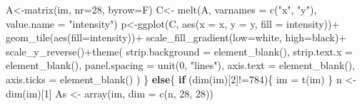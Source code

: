 \documentclass[
]{book}
\newenvironment{Shaded}{\begin{snugshade}}{\end{snugshade}}
\newcommand{\AttributeTok}[1]{\textcolor[rgb]{0.77,0.63,0.00}{#1}}
\newcommand{\ControlFlowTok}[1]{\textcolor[rgb]{0.13,0.29,0.53}{\textbf{#1}}}
\newcommand{\DecValTok}[1]{\textcolor[rgb]{0.00,0.00,0.81}{#1}}
\newcommand{\FunctionTok}[1]{\textcolor[rgb]{0.00,0.00,0.00}{#1}}
\newcommand{\NormalTok}[1]{#1}
\newcommand{\OtherTok}[1]{\textcolor[rgb]{0.56,0.35,0.01}{#1}}
\newcommand{\SpecialCharTok}[1]{\textcolor[rgb]{0.00,0.00,0.00}{#1}}
\newcommand{\StringTok}[1]{\textcolor[rgb]{0.31,0.60,0.02}{#1}}
\theoremstyle{definition}
\theoremstyle{definition}
\theoremstyle{definition}
\theoremstyle{definition}
\theoremstyle{remark}
\begin{document}
\begin{Shaded}
\begin{Highlighting}[]
\NormalTok{    A}\OtherTok{\textless{}{-}}\FunctionTok{matrix}\NormalTok{(im, }\AttributeTok{nr=}\DecValTok{28}\NormalTok{, }\AttributeTok{byrow=}\NormalTok{F)}
\NormalTok{    C}\OtherTok{\textless{}{-}} \FunctionTok{melt}\NormalTok{(A, }\AttributeTok{varnames =} \FunctionTok{c}\NormalTok{(}\StringTok{"x"}\NormalTok{, }\StringTok{"y"}\NormalTok{), }
             \AttributeTok{value.name =} \StringTok{"intensity"}\NormalTok{)}
\NormalTok{    p}\OtherTok{\textless{}{-}}\FunctionTok{ggplot}\NormalTok{(C, }\FunctionTok{aes}\NormalTok{(}\AttributeTok{x =}\NormalTok{ x, }\AttributeTok{y =}\NormalTok{ y, }\AttributeTok{fill =}\NormalTok{ intensity))}\SpecialCharTok{+}
      \FunctionTok{geom\_tile}\NormalTok{(}\FunctionTok{aes}\NormalTok{(}\AttributeTok{fill=}\NormalTok{intensity))}\SpecialCharTok{+}
      \FunctionTok{scale\_fill\_gradient}\NormalTok{(}\AttributeTok{low=}\StringTok{\textquotesingle{}white\textquotesingle{}}\NormalTok{, }\AttributeTok{high=}\StringTok{\textquotesingle{}black\textquotesingle{}}\NormalTok{)}\SpecialCharTok{+}
      \FunctionTok{scale\_y\_reverse}\NormalTok{()}\SpecialCharTok{+}\FunctionTok{theme}\NormalTok{(}
        \AttributeTok{strip.background =} \FunctionTok{element\_blank}\NormalTok{(),}
        \AttributeTok{strip.text.x =} \FunctionTok{element\_blank}\NormalTok{(),}
        \AttributeTok{panel.spacing =} \FunctionTok{unit}\NormalTok{(}\DecValTok{0}\NormalTok{, }\StringTok{"lines"}\NormalTok{),}
        \AttributeTok{axis.text =} \FunctionTok{element\_blank}\NormalTok{(),}
        \AttributeTok{axis.ticks =} \FunctionTok{element\_blank}\NormalTok{()}
\NormalTok{      ) }
\NormalTok{  \}}
  \ControlFlowTok{else}\NormalTok{\{}
    \ControlFlowTok{if}\NormalTok{ (}\FunctionTok{dim}\NormalTok{(im)[}\DecValTok{2}\NormalTok{]}\SpecialCharTok{!=}\DecValTok{784}\NormalTok{)\{}
\NormalTok{      im }\OtherTok{=} \FunctionTok{t}\NormalTok{(im)}
\NormalTok{    \} }
\NormalTok{    n }\OtherTok{\textless{}{-}} \FunctionTok{dim}\NormalTok{(im)[}\DecValTok{1}\NormalTok{]}
\NormalTok{    As }\OtherTok{\textless{}{-}} \FunctionTok{array}\NormalTok{(im, }\AttributeTok{dim =} \FunctionTok{c}\NormalTok{(n, }\DecValTok{28}\NormalTok{, }\DecValTok{28}\NormalTok{))}
    

\end{Highlighting}
\end{Shaded}
\end{document}
